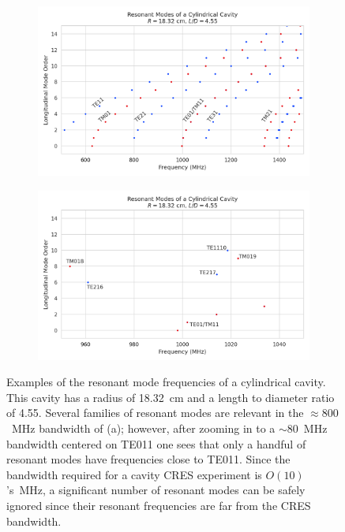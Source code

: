 \begin{figure}
    \centering
    \begin{subfigure}{0.67\textwidth}
        \centering
        \includegraphics*[width=1\textwidth]{figs/Chapter-6/230610_resmodes_1ghz_ld4pt5_wide.png}
        \caption{}
    \end{subfigure}
    \hfill
    \begin{subfigure}{0.67\textwidth}
        \centering
        \includegraphics*[width=1\textwidth]{figs/Chapter-6/230610_resmodes_1ghz_ld4pt5.png}
        \caption{}
    \end{subfigure}
    \caption{\label{fig:chap6-res-mode-freq-cylindrical-cav} Examples of the resonant mode frequencies of a cylindrical cavity. This cavity has a radius of 18.32~cm and a length to diameter ratio of 4.55. Several families of resonant modes are relevant in the $\approx800$~MHz bandwidth of (a); however, after zooming in to a $\sim80$~MHz bandwidth centered on TE011 one sees that only a handful of resonant modes have frequencies close to TE011. Since the bandwidth required for a cavity CRES experiment is $O(10)$'s~MHz, a significant number of resonant modes can be safely ignored since their resonant frequencies are far from the CRES bandwidth.}
\end{figure}

